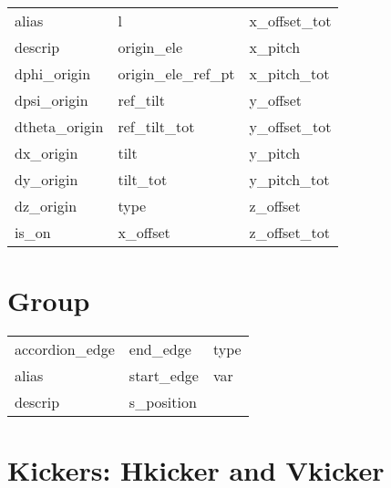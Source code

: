  \begin{tabular}{lll} \toprule
alias                       & l                           & x_offset_tot                \\
descrip                     & origin_ele                  & x_pitch                     \\
dphi_origin                 & origin_ele_ref_pt           & x_pitch_tot                 \\
dpsi_origin                 & ref_tilt                    & y_offset                    \\
dtheta_origin               & ref_tilt_tot                & y_offset_tot                \\
dx_origin                   & tilt                        & y_pitch                     \\
dy_origin                   & tilt_tot                    & y_pitch_tot                 \\
dz_origin                   & type                        & z_offset                    \\
is_on                       & x_offset                    & z_offset_tot                \\
 \bottomrule
 \end{tabular}
 \vfill
 
 \section{Group}
 \label{s:list.group}
 
 \begin{tabular}{lll} \toprule
accordion_edge              & end_edge                    & type                        \\
alias                       & start_edge                  & var                         \\
descrip                     & s_position                  &                             \\
 \bottomrule
 \end{tabular}
 \vfill
 
 \section{Kickers: Hkicker and Vkicker}
 \label{s:list.hvkicker}
 
